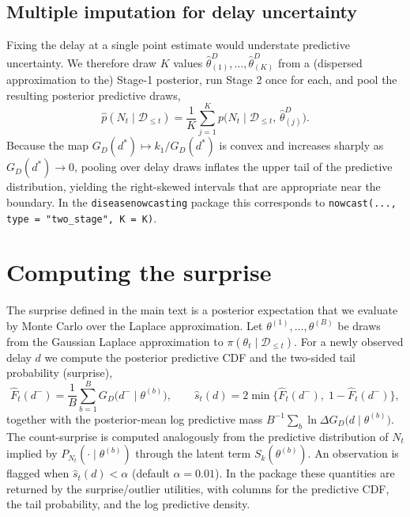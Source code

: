 \documentclass{article}
\begin{document}
{\subsection{Multiple imputation for delay uncertainty}
Fixing the delay at a single point estimate would understate predictive uncertainty. We therefore draw $K$ values $\widehat\theta^{D}_{(1)}, \dots, \widehat\theta^{D}_{(K)}$ from a (dispersed approximation to the) Stage-1 posterior, run Stage 2 once for each, and pool the resulting posterior predictive draws,
\begin{equation}
  \widehat{p}(N_t \mid \mathcal{D}_{\le t}) = \frac{1}{K}\sum_{j=1}^{K} p\big(N_t \mid \mathcal{D}_{\le t},\, \widehat\theta^{D}_{(j)}\big).
\end{equation}
Because the map $G_D(d^*) \mapsto k_1 / G_D(d^*)$ is convex and increases sharply as $G_D(d^*) \to 0$, pooling over delay draws inflates the upper tail of the predictive distribution, yielding the right-skewed intervals that are appropriate near the boundary. In the \texttt{diseasenowcasting} package this corresponds to \texttt{nowcast(..., type = "two\_stage", K = K)}.
}

\section{\color{red} Computing the surprise}

{\color{red}
The surprise defined in the main text is a posterior expectation that we evaluate by Monte Carlo over the Laplace approximation. Let $\theta^{(1)}, \dots, \theta^{(B)}$ be draws from the Gaussian Laplace approximation to $\pi(\theta_t \mid \mathcal{D}_{\le t})$. For a newly observed delay $d$ we compute the posterior predictive CDF and the two-sided tail probability (surprise),
\begin{equation}
  \widehat F_t(d^-) = \frac{1}{B}\sum_{b=1}^{B} G_D\big(d^- \mid \theta^{(b)}\big), \qquad
  \widehat s_t(d) = 2\min\bigl\{\widehat F_t(d^-),\; 1 - \widehat F_t(d^-)\bigr\},
\end{equation}
together with the posterior-mean log predictive mass $B^{-1}\sum_{b} \ln \Delta G_D\big(d \mid \theta^{(b)}\big)$. The count-surprise is computed analogously from the predictive distribution of $N_t$ implied by $P_{N_t}(\cdot \mid \theta^{(b)})$ through the latent term $S_k(\theta^{(b)})$. An observation is flagged when $\widehat s_t(d) < \alpha$ (default $\alpha = 0.01$). In the package these quantities are returned by the surprise/outlier utilities, with columns for the predictive CDF, the tail probability, and the log predictive density.
}



\end{document}
